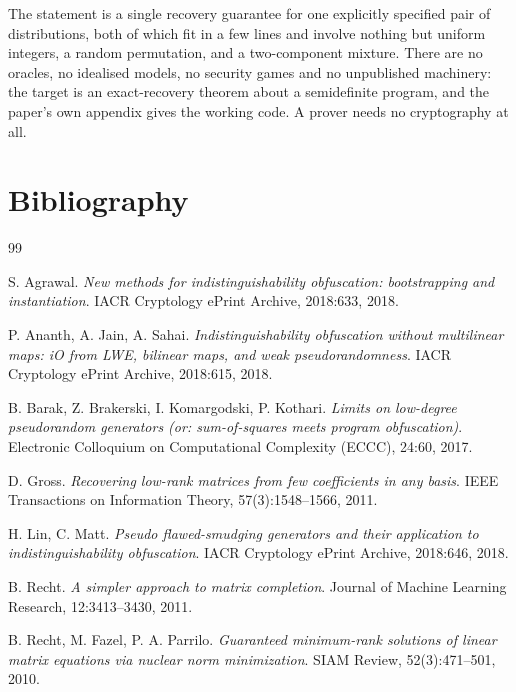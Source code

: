 \documentclass{aicr-conjecture}
\begin{document}
\begin{remark}\label{rem:clean}
The statement is a single recovery guarantee for one explicitly
specified pair of distributions, both of which fit in a few lines and
involve nothing but uniform integers, a random permutation, and a
two-component mixture. There are no oracles, no idealised models, no
security games and no unpublished machinery: the target is an
exact-recovery theorem about a semidefinite program, and the paper's
own appendix gives the working code. A prover needs no cryptography at
all.
\end{remark}

\section{Bibliography}

\begin{aicrbibliography}{99}

S. Agrawal.
\emph{New methods for indistinguishability obfuscation: bootstrapping
and instantiation}.
IACR Cryptology ePrint Archive, 2018:633, 2018.

P. Ananth, A. Jain, A. Sahai.
\emph{Indistinguishability obfuscation without multilinear maps: iO
from LWE, bilinear maps, and weak pseudorandomness}.
IACR Cryptology ePrint Archive, 2018:615, 2018.

B. Barak, Z. Brakerski, I. Komargodski, P. Kothari.
\emph{Limits on low-degree pseudorandom generators (or: sum-of-squares
meets program obfuscation)}.
Electronic Colloquium on Computational Complexity (ECCC), 24:60, 2017.

D. Gross.
\emph{Recovering low-rank matrices from few coefficients in any basis}.
IEEE Transactions on Information Theory, 57(3):1548--1566, 2011.

H. Lin, C. Matt.
\emph{Pseudo flawed-smudging generators and their application to
indistinguishability obfuscation}.
IACR Cryptology ePrint Archive, 2018:646, 2018.

B. Recht.
\emph{A simpler approach to matrix completion}.
Journal of Machine Learning Research, 12:3413--3430, 2011.

B. Recht, M. Fazel, P. A. Parrilo.
\emph{Guaranteed minimum-rank solutions of linear matrix equations via
nuclear norm minimization}.
SIAM Review, 52(3):471--501, 2010.

\end{aicrbibliography}
\end{document}
